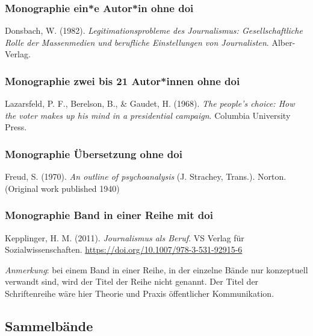 \documentclass[
  letterpaper,
  DIV=11]{scrreprt}
\begin{document}
\hypertarget{monographie-eine-autorin-ohne-doi}{%
\subsubsection{Monographie \textbar{} ein*e Autor*in \textbar{} ohne
doi}\label{monographie-eine-autorin-ohne-doi}}

Donsbach, W. (1982). \emph{Legitimationsprobleme des Journalismus:
Gesellschaftliche Rolle der Massenmedien und berufliche Einstellungen
von Journalisten}. Alber-Verlag.

\hypertarget{monographie-zwei-bis-21-autorinnen-ohne-doi}{%
\subsubsection{Monographie \textbar{} zwei bis 21 Autor*innen \textbar{}
ohne doi}\label{monographie-zwei-bis-21-autorinnen-ohne-doi}}

Lazarsfeld, P. F., Berelson, B., \& Gaudet, H. (1968). \emph{The
people's choice: How the voter makes up his mind in a presidential
campaign}. Columbia University Press.

\hypertarget{monographie-uxfcbersetzung-ohne-doi}{%
\subsubsection{Monographie \textbar{} Übersetzung \textbar{} ohne
doi}\label{monographie-uxfcbersetzung-ohne-doi}}

Freud, S. (1970). \emph{An outline of psychoanalysis} (J. Strachey,
Trans.). Norton. (Original work published 1940)

\hypertarget{monographie-band-in-einer-reihe-mit-doi}{%
\subsubsection{Monographie \textbar{} Band in einer Reihe \textbar{} mit
doi}\label{monographie-band-in-einer-reihe-mit-doi}}

Kepplinger, H. M. (2011). \emph{Journalismus als Beruf}. VS Verlag für
Sozialwissenschaften. \url{https://doi.org/10.1007/978-3-531-92915-6}

\emph{Anmerkung}: bei einem Band in einer Reihe, in der einzelne Bände
nur konzeptuell verwandt sind, wird der Titel der Reihe nicht genannt.
Der Titel der Schriftenreihe wäre hier Theorie und Praxis öffentlicher
Kommunikation.

\hypertarget{sammelbuxe4nde}{%
\subsection{Sammelbände}\label{sammelbuxe4nde}}
\end{document}
